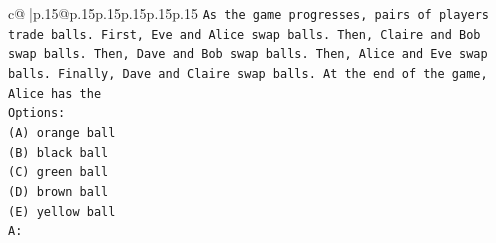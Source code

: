 \documentclass{article}
\begin{document}
{\begin{supertabular}{c@{$\;$}|p{.15\linewidth}@{}p{.15\linewidth}p{.15\linewidth}p{.15\linewidth}p{.15\linewidth}p{.15\linewidth}}
{{{\texttt{As the game progresses, pairs of players trade balls. First, Eve and Alice swap balls. Then, Claire and Bob swap balls. Then, Dave and Bob swap balls. Then, Alice and Eve swap balls. Finally, Dave and Claire swap balls. At the end of the game, Alice has the} \\
\texttt{Options:} \\
\texttt{(A) orange ball} \\
\texttt{(B) black ball} \\
\texttt{(C) green ball} \\
\texttt{(D) brown ball} \\
\texttt{(E) yellow ball} \\
\texttt{A:} \\
            }
        }
    }
     \\ \\


\end{supertabular}}
\end{document}
